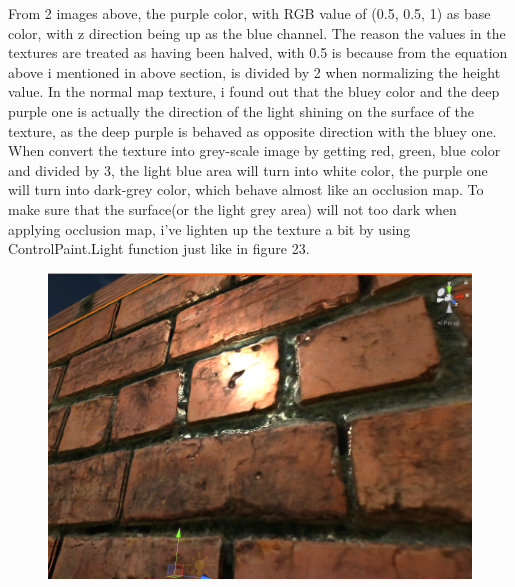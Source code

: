 \documentclass[a4paper, 13pt]{extarticle}
\begin{document}
{\begin{figure}[h]
{\begin{minipage}{.4\textwidth}
			\centering
			\label{fig:test23}
		\end{minipage}
	}
\end{figure}
\vspace{5.5cm}
From 2 images above, the purple color, with RGB value of (0.5, 0.5, 1) as base color, with z direction being up as the blue channel. The reason the values in the textures are treated as having been halved, with 0.5 is because from the equation above i mentioned in above section, is divided by 2 when normalizing the height value. In the normal map texture, i found out that the bluey color and the deep purple one is actually the direction of the light shining on the surface of the texture, as the deep purple is behaved as opposite direction with the bluey one. When convert the texture into grey-scale image by getting red, green, blue color and divided by 3, the light blue area will turn into white color, the purple one will turn into dark-grey color, which behave almost like an occlusion map. To make sure that the surface(or the light grey area) will not too dark when applying occlusion map, i've lighten up the texture a bit by using ControlPaint.Light function just like in figure 23. 
\begin{figure}[h]
	\begin{minipage}{.4\textwidth}
		\centering
		\includegraphics[width=1\linewidth]{intructions/without_occlusion.png}
		\centering
		\label{fig:test24}
	\end{minipage}
	\begin{minipage}{.45\textwidth}
		\centering

\end{minipage}
\end{figure}}
\end{document}
